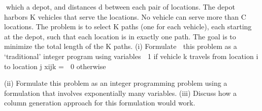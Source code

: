 which a depot, and distances d between each pair of locations. The depot harbors K vehicles that serve
the locations. No vehicle can serve more than C locations. The problem is to select K paths (one for
each vehicle), each starting at the depot, such that each location is in exactly one path. The goal is to
minimize the total length of the K paths.
(i) Formulate
 this problem as a ‘traditional' integer program using variables
 1 if vehicle k travels from location i to location j
xijk =
 0 otherwise

(ii) Formulate this problem as an integer programming problem using a formulation that involves
exponentially many variables.
(iii) Discuss how a column generation approach for this formulation would work.